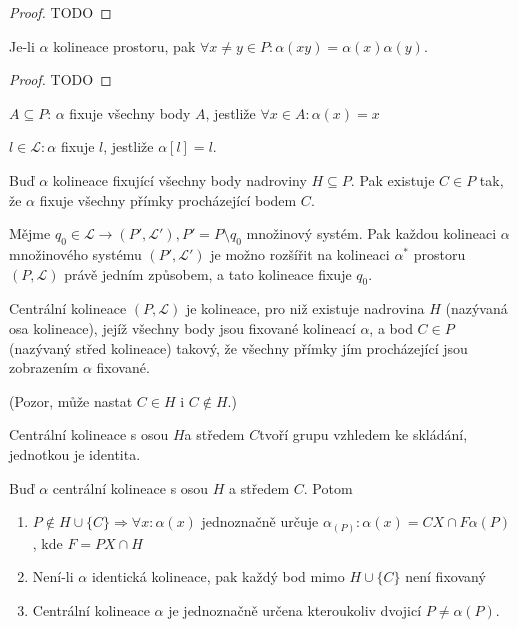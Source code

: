 \begin{proof}
    TODO
\end{proof}
\begin{note}
    Je-li $\alpha$ kolineace prostoru, pak $\forall x\neq y\in P: \alpha(xy)=\alpha(x)\alpha(y)$.
\end{note}
\begin{proof}
    TODO
\end{proof}
\begin{definition}[Fixace]
    $A\subseteq P$: $\alpha$ fixuje všechny body $A$, jestliže $\forall x\in A: \alpha(x)=x$

    $l\in\mathcal{L}: \alpha$ fixuje $l$, jestliže $\alpha[l]=l$.
\end{definition}
\begin{lemma}
    Buď $\alpha$ kolineace fixující všechny body nadroviny $H\subseteq P$.
    Pak existuje $C\in P$ tak, že $\alpha$ fixuje  všechny přímky procházející bodem $C$.
\end{lemma}
\begin{lemma}
    Mějme $q_0\in\mathcal{L}\rightarrow (P',\mathcal{L}'), P' = P\setminus q_0$ množinový systém.
    Pak každou kolineaci $\alpha$ množinového systému $(P',\mathcal{L}')$ je možno rozšířit na kolineaci $\alpha^*$ prostoru $(P, \mathcal{L})$ právě jedním způsobem, a tato kolineace fixuje $q_0$.
\end{lemma}
\begin{definition}
    Centrální kolineace $(P,\mathcal{L})$ je kolineace, pro niž existuje nadrovina $H$ (nazývaná osa kolineace), jejíž všechny body jsou fixované kolineací $\alpha$, a bod $C\in P$ (nazývaný střed kolineace) takový, že všechny přímky jím procházející jsou zobrazením $\alpha$ fixované.

    (Pozor, může nastat $C\in H$ i $C\not\in H$.)
\end{definition}
\begin{lemma}
    Centrální kolineace s osou $H$a středem $C$tvoří grupu vzhledem ke skládání, jednotkou je identita.
\end{lemma}
\begin{lemma}
    Buď $\alpha$ centrální kolineace s osou $H$ a středem $C$. Potom
    \begin{enumerate}
        \item $P\not\in H\cup\{C\}\Rightarrow \forall x: \alpha(x)$ jednoznačně určuje $\alpha_(P): \alpha(x)=CX\cap F\alpha(P)$, kde $F=PX\cap H$
        \item Není-li $\alpha$ identická kolineace, pak každý bod mimo $H\cup \{C\}$ není fixovaný
        \item Centrální kolineace $\alpha$ je jednoznačně určena kteroukoliv dvojicí $P\neq\alpha(P)$.
    \end{enumerate}
\end{lemma}

